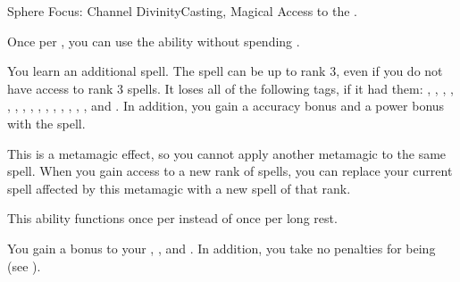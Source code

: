  \begin{magicalfeat}{Sphere Focus: Channel Divinity}{Casting, Magical}
    \featpre Access to the  .

     Once per , you can use the  ability without spending .     

     You learn an additional spell.
    The spell can be up to rank 3, even if you do not have access to rank 3 spells.
    It loses all of the following tags, if it had them: \atAcid, \atAir, \atAuditory, \atBlood, \atCompulsion, \atCold, \atEarth, \atElectricity, \atEmotion, \atFire, \atLife, \atPhysical, \atPoison, \atSpeech, \atVisual, and \atWater.
    In addition, you gain a  accuracy bonus and a  power bonus with the spell.

    This is a metamagic effect, so you cannot apply another metamagic to the same spell.
    When you gain access to a new rank of spells, you can replace your current spell affected by this metamagic with a new spell of that rank.

     This ability functions once per  instead of once per long rest.

     You gain a  bonus to your , , and .
    In addition, you take no penalties for being  (see ).
  \end{magicalfeat}

